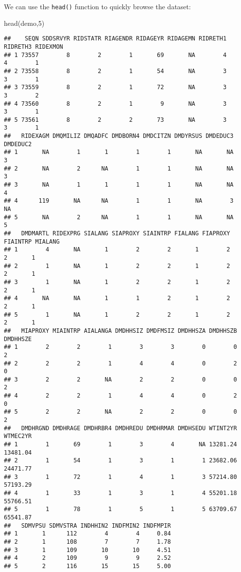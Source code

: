 \documentclass[
]{book}
\newenvironment{Shaded}{\begin{snugshade}}{\end{snugshade}}
\newcommand{\DecValTok}[1]{\textcolor[rgb]{0.00,0.00,0.81}{#1}}
\newcommand{\FunctionTok}[1]{\textcolor[rgb]{0.00,0.00,0.00}{#1}}
\newcommand{\NormalTok}[1]{#1}
\begin{document}
We can use the \texttt{head()} function to quickly browse the dataset:

\begin{Shaded}
\begin{Highlighting}[]
\FunctionTok{head}\NormalTok{(demo,}\DecValTok{5}\NormalTok{)}
\end{Highlighting}
\end{Shaded}

\begin{verbatim}
##    SEQN SDDSRVYR RIDSTATR RIAGENDR RIDAGEYR RIDAGEMN RIDRETH1 RIDRETH3 RIDEXMON
## 1 73557        8        2        1       69       NA        4        4        1
## 2 73558        8        2        1       54       NA        3        3        1
## 3 73559        8        2        1       72       NA        3        3        2
## 4 73560        8        2        1        9       NA        3        3        1
## 5 73561        8        2        2       73       NA        3        3        1
##   RIDEXAGM DMQMILIZ DMQADFC DMDBORN4 DMDCITZN DMDYRSUS DMDEDUC3 DMDEDUC2
## 1       NA        1       1        1        1       NA       NA        3
## 2       NA        2      NA        1        1       NA       NA        3
## 3       NA        1       1        1        1       NA       NA        4
## 4      119       NA      NA        1        1       NA        3       NA
## 5       NA        2      NA        1        1       NA       NA        5
##   DMDMARTL RIDEXPRG SIALANG SIAPROXY SIAINTRP FIALANG FIAPROXY FIAINTRP MIALANG
## 1        4       NA       1        2        2       1        2        2       1
## 2        1       NA       1        2        2       1        2        2       1
## 3        1       NA       1        2        2       1        2        2       1
## 4       NA       NA       1        1        2       1        2        2       1
## 5        1       NA       1        2        2       1        2        2       1
##   MIAPROXY MIAINTRP AIALANGA DMDHHSIZ DMDFMSIZ DMDHHSZA DMDHHSZB DMDHHSZE
## 1        2        2        1        3        3        0        0        2
## 2        2        2        1        4        4        0        2        0
## 3        2        2       NA        2        2        0        0        2
## 4        2        2        1        4        4        0        2        0
## 5        2        2       NA        2        2        0        0        2
##   DMDHRGND DMDHRAGE DMDHRBR4 DMDHREDU DMDHRMAR DMDHSEDU WTINT2YR WTMEC2YR
## 1        1       69        1        3        4       NA 13281.24 13481.04
## 2        1       54        1        3        1        1 23682.06 24471.77
## 3        1       72        1        4        1        3 57214.80 57193.29
## 4        1       33        1        3        1        4 55201.18 55766.51
## 5        1       78        1        5        1        5 63709.67 65541.87
##   SDMVPSU SDMVSTRA INDHHIN2 INDFMIN2 INDFMPIR
## 1       1      112        4        4     0.84
## 2       1      108        7        7     1.78
## 3       1      109       10       10     4.51
## 4       2      109        9        9     2.52
## 5       2      116       15       15     5.00
\end{verbatim}
\end{document}
